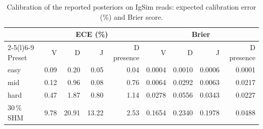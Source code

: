 \documentclass[11pt,a4paper]{article}
\begin{document}
\begin{table}[tbp]
\centering
\caption{Calibration of the reported posteriors on IgSim reads: expected
calibration error (\%) and Brier score.}
\label{tab:calibration}
\footnotesize
\begin{tabular}{@{}l rrrr rrrr@{}}
\toprule
 & \multicolumn{4}{c}{ECE (\%)} & \multicolumn{4}{c}{Brier} \\
\cmidrule(lr){2-5}\cmidrule(l){6-9}
Preset & V & D & J & D presence & V & D & J & D presence \\
\midrule
easy       & 0.09 & 0.20 & 0.05 & 0.04 & 0.0004 & 0.0010 & 0.0006 & 0.0001 \\
mid        & 0.12 & 0.96 & 0.08 & 0.76 & 0.0064 & 0.0292 & 0.0063 & 0.0217 \\
hard       & 0.47 & 1.87 & 0.80 & 1.14 & 0.0278 & 0.0556 & 0.0343 & 0.0227 \\
30\,\% SHM & 9.78 & 20.91 & 13.22 & 2.53 & 0.1654 & 0.2340 & 0.1978 & 0.0488 \\
\bottomrule
\end{tabular}
\end{table}
\end{document}
